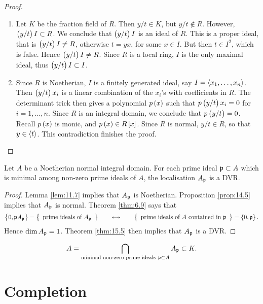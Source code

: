 \begin{proof}
\begin{itemize}[leftmargin=0.5in]
\begin{enumerate}[leftmargin=0.5in, label=Step \arabic*.]

\item Let $ K $ be the fraction field of $ R $. Then $ y / t \in K $, but $ y / t \notin R $. However, $ \br{y / t}I \subset R $. We conclude that $ \br{y / t}I $ is an ideal of $ R $. This is a proper ideal, that is $ \br{y / t}I \ne R $, otherwise $ t = yx $, for some $ x \in I $. But then $ t \in I^2 $, which is false. Hence $ \br{y / t}I \ne R $. Since $ R $ is a local ring, $ I $ is the only maximal ideal, thus $ \br{y / t}I \subset I $.
\item Since $ R $ is Noetherian, $ I $ is a finitely generated ideal, say $ I = \left\langle x_1, \dots, x_n \right\rangle $. Then $ \br{y / t}x_i $ is a linear combination of the $ x_i $'s with coefficients in $ R $. The determinant trick then gives a polynomial $ p\br{x} $ such that $ p\br{y / t}x_i = 0 $ for $ i = 1, \dots, n $. Since $ R $ is an integral domain, we conclude that $ p\br{y / t} = 0 $. Recall $ p\br{x} $ is monic, and $ p\br{x} \in R\sbr{x} $. Since $ R $ is normal, $ y / t \in R $, so that $ y \in \left\langle t \right\rangle $. This contradiction finishes the proof.
\end{enumerate}
\end{itemize}
\end{proof}

\begin{corollary}
Let $ A $ be a Noetherian normal integral domain. For each prime ideal $ \mathfrak{p} \subset A $ which is minimal among non-zero prime ideals of $ A $, the localisation $ A_{\mathfrak{p}} $ is a DVR.
\end{corollary}

\begin{proof}
Lemma \ref{lem:11.7} implies that $ A_{\mathfrak{p}} $ is Noetherian. Proposition \ref{prop:14.5} implies that $ A_{\mathfrak{p}} $ is normal. Theorem \ref{thm:6.9} says that
$$ \cbr{0, \ppp A_\ppp} = \correspondence{\text{prime ideals of} \ A_\ppp}{\text{prime ideals of} \ A \ \text{contained in} \ \ppp} = \cbr{0, \ppp}. $$
Hence $ \dim A_{\mathfrak{p}} = 1 $. Theorem \ref{thm:15.5} then implies that $ A_{\mathfrak{p}} $ is a DVR.
\end{proof}

\begin{remark*}
$$ A = \bigcap_{\text{minimal non-zero prime ideals} \ \mathfrak{p} \subset A} A_{\mathfrak{p}} \subset K. $$
\end{remark*}

\pagebreak

\section{Completion}

